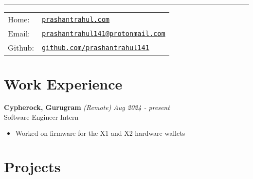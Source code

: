 \documentclass[a4paper,11pt]{article}
\begin{document}
 \vspace{0.5em}

\hrule\vspace{1em}

\noindent
\begin{tabular}{@{}l l}
Home: & \href{https://prashantrahul.com}{\texttt{prashantrahul.com}} \\
Email: & \href{mailto:prashantrahul141@protonmail.com}{\texttt{prashantrahul141@protonmail.com}} \\
Github: & \href{https://github.com/prashantrahul141}{\texttt{github.com/prashantrahul141}} \\
\end{tabular}

\section*{Work Experience}

\noindent\textbf{Cypherock, Gurugram} \textit{(Remote)} \hfill \textit{Aug 2024 - present}\\
\noindent Software Engineer Intern
\begin{itemize}[noitemsep, topsep=0pt]
    \item Worked on firmware for the X1 and X2 hardware wallets
\end{itemize}

\section*{Projects}
\end{document}
